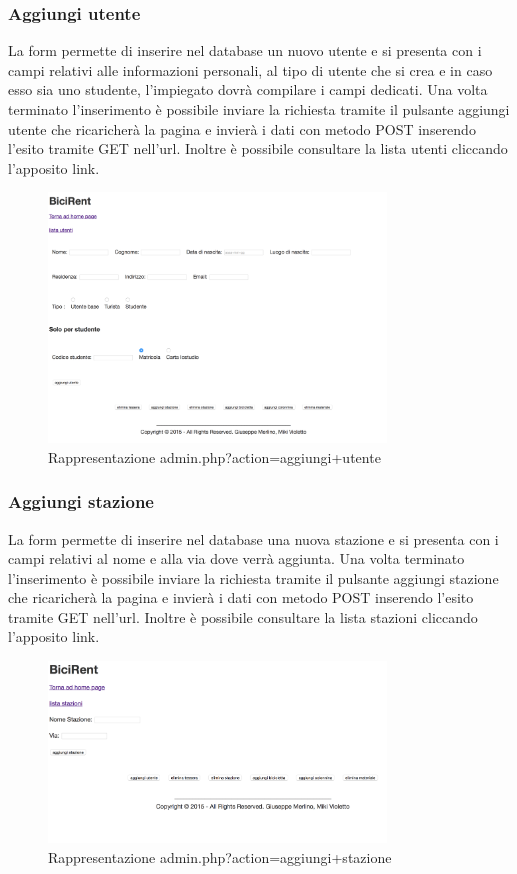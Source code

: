 \documentclass[a4paper,twoside]{article}
\begin{document}
\subsubsection{Aggiungi utente}
La form permette di inserire nel database un nuovo utente e si presenta con i campi relativi alle informazioni personali, al tipo di utente che si crea e in caso esso sia uno studente, l'impiegato dovrà compilare i campi dedicati. Una volta terminato l'inserimento è possibile inviare la richiesta tramite il pulsante aggiungi utente che ricaricherà la pagina e invierà i dati con metodo POST inserendo l'esito tramite GET nell'url. Inoltre è possibile consultare la lista utenti cliccando l'apposito link.
\begin{figure}[H]
	\centering
	\includegraphics[width=0.8\textwidth]{Screenshot07}
	\caption{Rappresentazione admin.php?action=aggiungi+utente}
\end{figure}
\subsubsection{Aggiungi stazione}
La form permette di inserire nel database una nuova stazione e si presenta con i campi relativi al nome e alla via dove verrà aggiunta. Una volta terminato l'inserimento è possibile inviare la richiesta tramite il pulsante aggiungi stazione che ricaricherà la pagina e invierà i dati con metodo POST inserendo l'esito tramite GET nell'url. Inoltre è possibile consultare la lista stazioni cliccando l'apposito link.
\begin{figure}[H]
	\centering
	\includegraphics[width=0.8\textwidth]{Screenshot08}
	\caption{Rappresentazione admin.php?action=aggiungi+stazione}
\end{figure}
\end{document}
